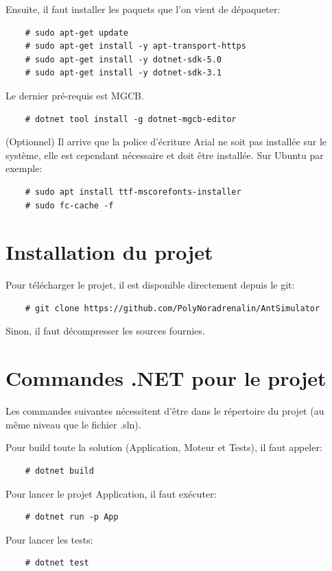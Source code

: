 \documentclass{EPUProjetDi}
\begin{document}
Ensuite, il faut installer les paquets que l'on vient de dépaqueter:


\begin{verbatim}
    # sudo apt-get update
    # sudo apt-get install -y apt-transport-https
    # sudo apt-get install -y dotnet-sdk-5.0
    # sudo apt-get install -y dotnet-sdk-3.1
\end{verbatim}

Le dernier pré-requis est MGCB.

\begin{verbatim}
    # dotnet tool install -g dotnet-mgcb-editor
\end{verbatim}

(Optionnel) Il arrive que la police d'écriture Arial ne soit pas installée sur le système, elle est cependant nécessaire
et doit être installée. Sur Ubuntu par exemple:
\begin{verbatim}
    # sudo apt install ttf-mscorefonts-installer
    # sudo fc-cache -f
\end{verbatim}

\section*{Installation du projet}
Pour télécharger le projet, il est disponible directement depuis le git:
\begin{verbatim}
    # git clone https://github.com/PolyNoradrenalin/AntSimulator
\end{verbatim}

Sinon, il faut décompresser les sources fournies.

\section*{Commandes .NET pour le projet}
Les commandes suivantes nécessitent d'être dans le répertoire du projet (au même niveau que le fichier .sln).

Pour build toute la solution (Application, Moteur et Tests), il faut appeler:
\begin{verbatim}
    # dotnet build
\end{verbatim}

Pour lancer le projet Application, il faut exécuter:
\begin{verbatim}
    # dotnet run -p App
\end{verbatim}

Pour lancer les tests:
\begin{verbatim}
    # dotnet test
\end{verbatim}
\end{document}
